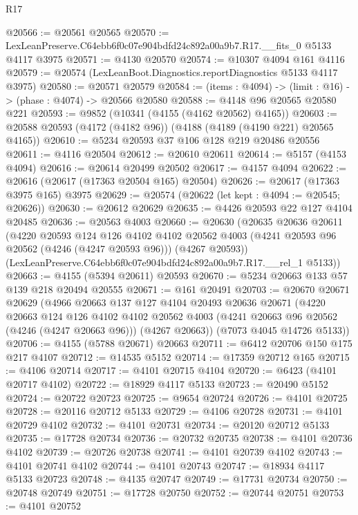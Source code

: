 \begin{lexlean}{R17}
\begin{coremodule}
@20566 := @20561 @20565
@20570 := LexLeanPreserve.C64ebb6f0c07e904bdfd24c892a00a9b7.R17.__fits_0 @5133 @4117 @3975
@20571 := @4130 @20570
@20574 := @10307 @4094 @161 @4116
@20579 := @20574 (LexLeanBoot.Diagnostics.reportDiagnostics @5133 @4117 @3975)
@20580 := @20571 @20579
@20584 := (items : @4094) -> (limit : @16) -> (phase : @4074) -> @20566 @20580
@20588 := @4148 @96 @20565 @20580 @221
@20593 := @9852 (@10341 (@4155 (@4162 @20562) @4165))
@20603 := @20588 @20593 (@4172 (@4182 @96)) (@4188 (@4189 (@4190 @221) @20565 @4165))
@20610 := @5234 @20593 @37 @106 @128 @219 @20486 @20556
@20611 := @4116 @20504
@20612 := @20610 @20611
@20614 := @5157 (@4153 @4094)
@20616 := @20614 @20499 @20502
@20617 := @4157 @4094
@20622 := @20616 (@20617 (@17363 @20504 @165) @20504)
@20626 := @20617 (@17363 @3975 @165) @3975
@20629 := @20574 (@20622 (let kept : @4094 := @20545; @20626))
@20630 := @20612 @20629
@20635 := @4426 @20593 @22 @127 @4104 @20485
@20636 := @20563 @4003
@20660 := @20630
    (@20635
      @20636
      @20611
      (@4220
        @20593
        @124
        @126
        @4102
        @4102
        @20562
        @4003
        (@4241 @20593 @96 @20562 (@4246 (@4247 @20593 @96)))
        (@4267 @20593))
      (LexLeanPreserve.C64ebb6f0c07e904bdfd24c892a00a9b7.R17.__rel_1 @5133))
@20663 := @4155 (@5394 @20611) @20593
@20670 := @5234 @20663 @133 @57 @139 @218 @20494 @20555
@20671 := @161 @20491
@20703 := @20670
    @20671
    @20629
    (@4966
      @20663
      @137
      @127
      @4104
      @20493
      @20636
      @20671
      (@4220
        @20663
        @124
        @126
        @4102
        @4102
        @20562
        @4003
        (@4241 @20663 @96 @20562 (@4246 (@4247 @20663 @96)))
        (@4267 @20663))
      (@7073 @4045 @14726 @5133))
@20706 := @4155 (@5788 @20671) @20663
@20711 := @6412 @20706 @150 @175 @217 @4107
@20712 := @14535 @5152
@20714 := @17359 @20712 @165
@20715 := @4106 @20714
@20717 := @4101 @20715 @4104
@20720 := @6423 (@4101 @20717 @4102)
@20722 := @18929 @4117 @5133
@20723 := @20490 @5152
@20724 := @20722 @20723
@20725 := @9654 @20724
@20726 := @4101 @20725
@20728 := @20116 @20712 @5133
@20729 := @4106 @20728
@20731 := @4101 @20729 @4102
@20732 := @4101 @20731
@20734 := @20120 @20712 @5133
@20735 := @17728 @20734
@20736 := @20732 @20735
@20738 := @4101 @20736 @4102
@20739 := @20726 @20738
@20741 := @4101 @20739 @4102
@20743 := @4101 @20741 @4102
@20744 := @4101 @20743
@20747 := @18934 @4117 @5133 @20723
@20748 := @4135 @20747
@20749 := @17731 @20734
@20750 := @20748 @20749
@20751 := @17728 @20750
@20752 := @20744 @20751
@20753 := @4101 @20752

\end{coremodule}
\end{lexlean}
